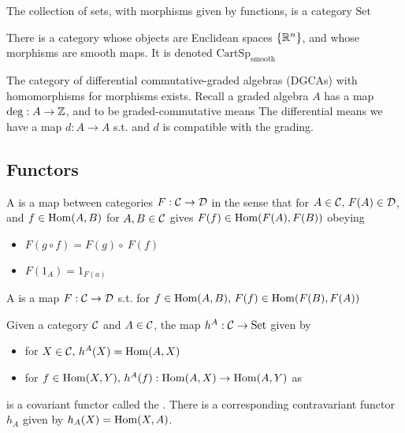 \documentclass{article}
\begin{document}
\begin{example}
	The collection of sets, with morphisms given by functions, is a category $\text{Set}$
\end{example}

\begin{example}
	There is a category whose objects are Euclidean spaces $\left\{ \mathbb{R}^n \right\}$, and whose morphisms are smooth maps. It is denoted $\text{CartSp}_{\text{smooth}}$
\end{example}

\begin{example}
	The category of differential commutative-graded algebras (DGCAs) with homomorphisms for morphisms exists. Recall a graded algebra $A$ has a map $\deg : A \to \mathbb{Z}$, and to be graded-commutative means 
	The differential means we have a map $d:A \to A$ s.t. 
	and $d$ is compatible with the grading.
\end{example}

\subsection{Functors}

\begin{definition}
	A  is a map between categories $F: \mathcal{C} \to \mathcal{D}$ in the sense that for $A \in \mathcal{C}, \, F(A) \in \mathcal{D}$, and $f \in \operatorname{Hom}(A,B)$ for $A,B \in \mathcal{C}$ gives $F(f) \in \operatorname{Hom}(F(A), F(B))$ obeying 
	\begin{itemize}
		\item $F(g \circ f) = F(g) \circ ~F(f)$ 
		\item $F(1_A) = 1_{F(a)}$
	\end{itemize}
	A  is a map $F:\mathcal{C} \to \mathcal{D}$ s.t. for $f \in \operatorname{Hom}(A,B), \, F(f) \in \operatorname{Hom}(F(B),F(A))$
\end{definition}

\begin{example}
	Given a category $\mathcal{C}$ and $A \in \mathcal{C}$, the map $h^A :\mathcal{C} \to \text{Set}$ given by 
	\begin{itemize}
		\item for $X \in \mathcal{C}, \, h^A(X) = \operatorname{Hom}(A,X)$
		\item for $f \in \operatorname{Hom}(X,Y), \, h^A(f):\operatorname{Hom}(A,X) \to \operatorname{Hom}(A,Y)$ as 
	\end{itemize}
	is a covariant functor called the . There is a corresponding contravariant functor $h_A$ given by $h_A(X) = \operatorname{Hom}(X,A)$.
\end{example}
\end{document}
